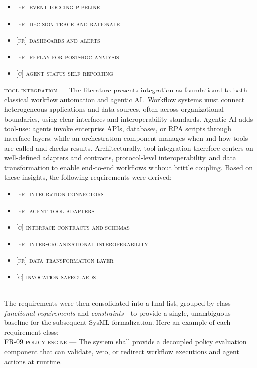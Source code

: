 \begin{itemize}
  \item \textsc{[fr] event logging pipeline}
  \item \textsc{[fr] decision trace and rationale}
  \item \textsc{[fr] dashboards and alerts}
  \item \textsc{[fr] replay for post-hoc analysis}
  \item \textsc{[c] agent status self-reporting}
\end{itemize}

\noindent \textsc{tool integration} --- The literature presents integration as foundational to both classical workflow automation and agentic AI.~Workflow systems must connect heterogeneous applications and data sources, often across organizational boundaries, using clear interfaces and interoperability standards. Agentic AI adds tool-use: agents invoke enterprise APIs, databases, or RPA scripts through interface layers, while an orchestration component manages when and how tools are called and checks results. Architecturally, tool integration therefore centers on well-defined adapters and contracts, protocol-level interoperability, and data transformation to enable end-to-end workflows without brittle coupling. Based on these insights, the following requirements were derived:

\begin{itemize}
  \item \textsc{[fr] integration connectors}
  \item \textsc{[fr] agent tool adapters}
  \item \textsc{[c] interface contracts and schemas}
  \item \textsc{[fr] inter-organizational interoperability}
  \item \textsc{[fr] data transformation layer}
  \item \textsc{[c] invocation safeguards}
\end{itemize} \\

The requirements were then consolidated into a final list, grouped by class---\emph{functional requirements} and \emph{constraints}—to provide a single, unambiguous baseline for the subsequent SysML formalization. Here an example of each requirement class: \\

\noindent \textsc{FR-09 policy engine} --- The system shall provide a decoupled policy evaluation component that can validate, veto, or redirect workflow executions and agent actions at runtime. \\


